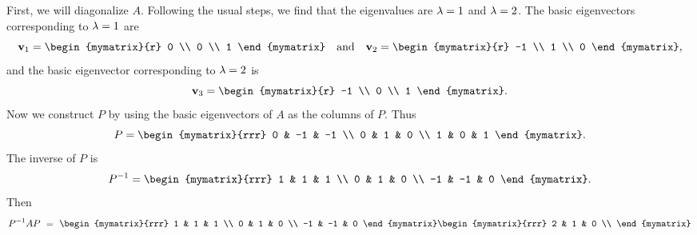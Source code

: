 \begin{solution}
  First, we will diagonalize $A$. Following the usual steps, we find
  that the eigenvalues are $\lambda=1$ and $\lambda=2$. The basic
  eigenvectors corresponding to $\lambda=1$ are
  \begin{equation*}
    \vect{v}_1 = \begin{mymatrix}{r} 0 \\ 0 \\ 1 \end{mymatrix}
    \quad\mbox{and}\quad
    \vect{v}_2 = \begin{mymatrix}{r} -1 \\ 1 \\ 0 \end{mymatrix},
  \end{equation*}
  and the basic eigenvector corresponding to $\lambda = 2$ is
  \begin{equation*}
    \vect{v}_3 = \begin{mymatrix}{r} -1 \\ 0 \\ 1 \end{mymatrix}.
  \end{equation*}
  Now we construct $P$ by using the basic eigenvectors of $A$ as the
  columns of $P$.  Thus
  \begin{equation*}
    P =
    \begin{mymatrix}{rrr}
      0 & -1 & -1 \\
      0 & 1 & 0 \\
      1 & 0 & 1
    \end{mymatrix}.
  \end{equation*}
  The inverse of $P$ is
  \begin{equation*}
    P^{-1}=\begin{mymatrix}{rrr}
      1 & 1 & 1 \\
      0 & 1 & 0 \\
      -1 & -1 & 0
    \end{mymatrix}.
  \end{equation*}
  Then
  \begin{equation*}
    P^{-1}AP
    ~=~
    \begin{mymatrix}{rrr}
      1 & 1 & 1 \\
      0 & 1 & 0 \\
      -1 & -1 & 0
    \end{mymatrix} \begin{mymatrix}{rrr}
      2 & 1 & 0 \\

\end{mymatrix}
\end{equation*}
\end{solution}
